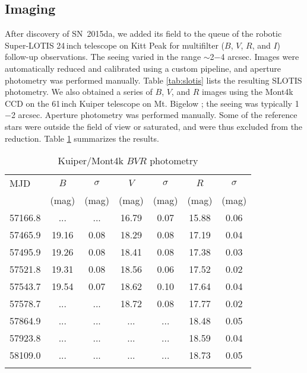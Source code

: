\documentclass[fleqn,usenatbib,useAMS]{mnras}
\begin{document}
\subsection{Imaging} \label{obs:slotis}
After discovery of SN~2015da, we added its field to the queue of the robotic Super-LOTIS 24\,inch telescope \citep[SLOTIS;][]{Wil08} on Kitt Peak for multifilter ($B$, $V$, $R$, and $I$) follow-up observations. The seeing varied in the range $\sim$2$-$4 arcsec. Images were automatically reduced and calibrated using a custom pipeline, %
and aperture photometry was performed manually. 
Table \ref{tab:slotis} lists the resulting SLOTIS photometry.  We also obtained a series of $B$, $V$, and $R$ images using the Mont4k CCD on the 61\,inch Kuiper telescope on Mt. Bigelow \citep{Fon14}; the seeing was typically 1$-$2 arcsec.  Aperture photometry was performed manually. Some of the reference stars were outside the field of view or saturated, and were thus excluded from the reduction. Table \ref{tab:kuiper} summarizes the results.  
%




\begin{table}\begin{center}\begin{minipage}{3.25in}
      \caption{Kuiper/Mont4k $BVR$ photometry}
\centering
\small
\begin{tabular}{@{}lcccccc}\hline\hline
MJD & $B$ & $\sigma$ & $V$  & $\sigma$  & $R$ & $\sigma$ \\ 
 &(mag) &(mag) &(mag) &(mag)  &(mag) &(mag) \\
\hline
57166.8 &...   &...   &16.79	&0.07 &15.88 &0.06\\
57465.9 &19.16 &0.08  &18.29	&0.08 &17.19 &0.04\\
57495.9 &19.26 &0.08  &18.41	&0.08 &17.38 &0.03\\
57521.8 &19.31 &0.08  &18.56	&0.06 &17.52 &0.02\\
57543.7 &19.54 &0.07  &18.62	&0.10 &17.64 &0.04\\
57578.7 &...   &...   &18.72	&0.08 &17.77 &0.02\\
57864.9 &...   &...   &...    &...  &18.48 &0.05 \\
57923.8 &...   &...   &...    &...  &18.59 &0.04 \\
58109.0 &...   &...   &...    &...  &18.73 &0.05 \\
\hline \\
\end{tabular}
\label{tab:kuiper}
\end{minipage}\end{center}
\end{table}
\end{document}
